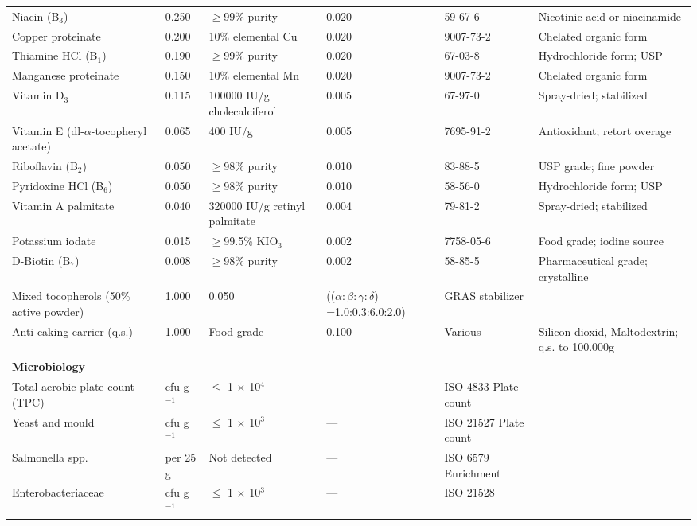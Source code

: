 \begin{longtable}{@{}p{6.0cm}p{1.5cm}p{1.8cm}p{2.0cm}p{3.0cm}p{3.0cm}@{}}
Niacin (B$_3$) & 0.250 & $\ge$99\% purity & 0.020 & 59-67-6 & Nicotinic acid or niacinamide \\[3pt]
Copper proteinate & 0.200 & 10\% elemental Cu & 0.020 & 9007-73-2 & Chelated organic form \\[3pt]
Thiamine HCl (B$_1$) & 0.190 & $\ge$99\% purity & 0.020 & 67-03-8 & Hydrochloride form; USP \\[3pt]
Manganese proteinate & 0.150 & 10\% elemental Mn & 0.020 & 9007-73-2 & Chelated organic form \\[3pt]
Vitamin D$_3$ & 0.115 & 100000 IU/g cholecalciferol & 0.005 & 67-97-0 & Spray-dried; stabilized \\[3pt]
Vitamin E (dl-$\alpha$-tocopheryl acetate) & 0.065 & 400 IU/g & 0.005 & 7695-91-2 & Antioxidant; retort overage \\[3pt]
Riboflavin (B$_2$) & 0.050 & $\ge$98\% purity & 0.010 & 83-88-5 & USP grade; fine powder \\[3pt]
Pyridoxine HCl (B$_6$) & 0.050 & $\ge$98\% purity & 0.010 & 58-56-0 & Hydrochloride form; USP \\[3pt]
Vitamin A palmitate & 0.040 & 320000 IU/g retinyl palmitate & 0.004 & 79-81-2 & Spray-dried; stabilized \\[3pt]
Potassium iodate & 0.015 & $\ge$99.5\% KIO$_3$ & 0.002 & 7758-05-6 & Food grade; iodine source \\[3pt]
D-Biotin (B$_7$) & 0.008 & $\ge$98\% purity & 0.002 & 58-85-5 & Pharmaceutical grade; crystalline \\[3pt]
\midrule
Mixed tocopherols (50\% active powder) & 1.000 & 0.050 & (($\alpha:\beta:\gamma:\delta$) =1.0:0.3:6.0:2.0) & GRAS stabilizer \\[3pt]
\midrule
Anti-caking carrier (q.s.) & 1.000 & Food grade & 0.100 & Various & Silicon dioxid, Maltodextrin; q.s. to 100.000g \\[6pt]

\multicolumn{6}{l}{\textbf{Microbiology}} \\[3pt]
Total aerobic plate count (TPC) & cfu g$^{-1}$ & $\le$ 1 $\times$ 10$^4$ & --- & ISO 4833 Plate count & \\[3pt]
Yeast and mould & cfu g$^{-1}$ & $\le$ 1 $\times$ 10$^3$ & --- & ISO 21527 Plate count & \\[3pt]
Salmonella spp. & per 25 g & Not detected & --- & ISO 6579 Enrichment & \\[3pt]
Enterobacteriaceae & cfu g$^{-1}$ & $\le$ 1 $\times$ 10$^3$ & --- & ISO 21528 & \\[6pt]


\end{longtable}
